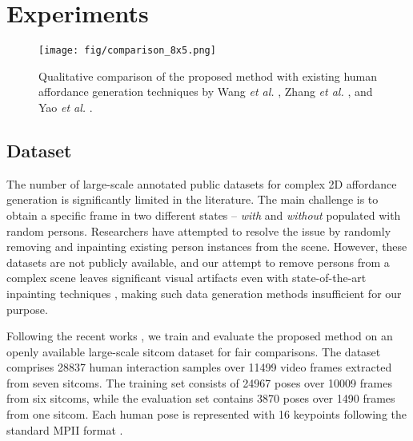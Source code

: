 \section{Experiments}
\label{sec:experiments}

\begin{figure*}[t]
  \centering
  \texttt{[image: fig/comparison\_8x5.png]}
  \caption{Qualitative comparison of the proposed method with existing human affordance generation techniques by Wang \emph{et al.} \cite{wang2017binge}, Zhang \emph{et al.} \cite{zhang2022inpaint}, and Yao \emph{et al.} \cite{yao2023scene}.}
  \label{fig:comparison}
  \vspace{-1.0em}
\end{figure*}

\subsection{Dataset}
\label{sec:experiments_dataset}
The number of large-scale annotated public datasets for complex 2D affordance generation is significantly limited in the literature. The main challenge is to obtain a specific frame in two different states -- \emph{with} and \emph{without} populated with random persons. Researchers \cite{zhang2022inpaint, zhu2023topnet} have attempted to resolve the issue by randomly removing and inpainting existing person instances from the scene. However, these datasets \cite{zhang2022inpaint, zhu2023topnet} are not publicly available, and our attempt to remove persons from a complex scene leaves significant visual artifacts even with state-of-the-art inpainting techniques \cite{suvorov2022resolution}, making such data generation methods \cite{zhang2022inpaint, zhu2023topnet} insufficient for our purpose.

Following the recent works \cite{wang2017binge, yao2023scene}, we train and evaluate the proposed method on an openly available large-scale sitcom dataset \cite{wang2017binge} for fair comparisons. The dataset comprises 28837 human interaction samples over 11499 video frames extracted from seven sitcoms. The training set consists of 24967 poses over 10009 frames from six sitcoms, while the evaluation set contains 3870 poses over 1490 frames from one sitcom. Each human pose is represented with 16 keypoints following the standard MPII format \cite{andriluka142d}.

